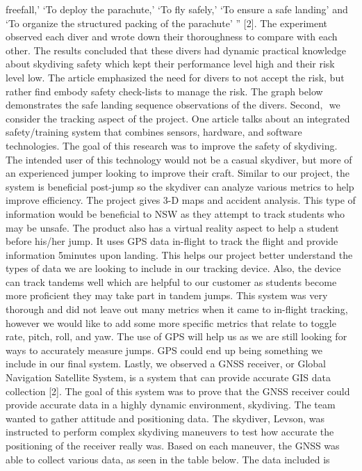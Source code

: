 freefall,’ ‘To deploy the parachute,’ ‘To fly safely,’ ‘To ensure a safe landing’ and ‘To organize the structured packing of
the parachute’ ” [2]. The experiment observed each diver and wrote down their thoroughness to compare with each
other. The results concluded that these divers had dynamic practical knowledge about skydiving safety which kept their
performance level high and their risk level low. The article emphasized the need for divers to not accept the risk, but
rather find embody safety check-lists to manage the risk. The graph below demonstrates the safe landing sequence
observations of the divers.
Second, ​ we consider the tracking aspect of the project. One article talks about an integrated safety/training system that
combines sensors, hardware, and software technologies. The goal of this research was to improve the safety of
skydiving. The intended user of this technology would not be a casual skydiver, but more of an experienced jumper
looking to improve their craft. Similar to our project, the system is beneficial post-jump so the skydiver can analyze
various metrics to help improve efficiency. The project gives 3-D maps and accident analysis. This type of information
would be beneficial to NSW as they attempt to track students who may be unsafe. The product also has a virtual reality
aspect to help a student before his/her jump. It uses GPS data in-flight to track the flight and provide information
5minutes upon landing. This helps our project better understand the types of data we are looking to include in our
tracking device. Also, the device can track tandems well which are helpful to our customer as students become more
proficient they may take part in tandem jumps. This system was very thorough and did not leave out many metrics when
it came to in-flight tracking, however we would like to add some more specific metrics that relate to toggle rate, pitch,
roll, and yaw. The use of GPS will help us as we are still looking for ways to accurately measure jumps. GPS could end up
being something we include in our final system.
Lastly, we observed a GNSS receiver, or Global Navigation Satellite System, is a system that can provide accurate GIS
data collection [2]. The goal of this system was to prove that the GNSS receiver could provide accurate data in a highly
dynamic environment, skydiving. The team wanted to gather attitude and positioning data. The skydiver, Levson, was
instructed to perform complex skydiving maneuvers to test how accurate the positioning of the receiver really was.
Based on each maneuver, the GNSS was able to collect various data, as seen in the table below. The data included is
